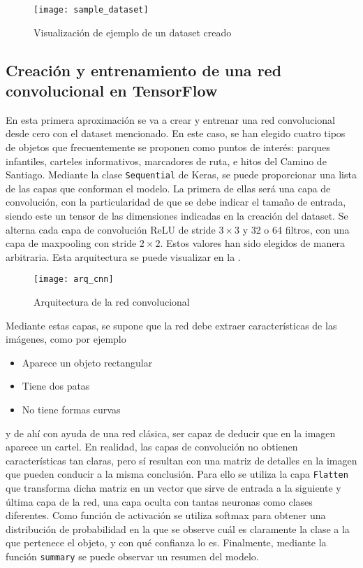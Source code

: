 			\begin{figure}
				\centering
				\texttt{[image: sample\_dataset]}
				\caption{Visualización de ejemplo de un dataset creado}
				\label{fig:sample_dataset}
			\end{figure}
			
		\subsection{Creación y entrenamiento de una red convolucional en TensorFlow}\label{subsec:crear_cnn}
		
			En esta primera aproximación se va a crear y entrenar una red convolucional desde cero con el dataset mencionado. En este caso, se han elegido cuatro tipos de objetos que frecuentemente se proponen como puntos de interés: parques infantiles, carteles informativos, marcadores de ruta, e hitos del Camino de Santiago. Mediante la clase \texttt{Sequential} de Keras, se puede proporcionar una lista de las capas que conforman el modelo. La primera de ellas será una capa de convolución, con la particularidad de que se debe indicar el tamaño de entrada, siendo este un tensor de las dimensiones indicadas en la creación del dataset. Se alterna cada capa de convolución ReLU de stride $3 \times 3$ y 32 o 64 filtros, con una capa de maxpooling con stride $2 \times 2$. Estos valores han sido elegidos de manera arbitraria. Esta arquitectura se puede visualizar en la . \\
			
			\begin{figure}[!h]
				\centering
				\texttt{[image: arq\_cnn]}
				\caption{Arquitectura de la red convolucional}
				\label{fig:arq_cnn}
			\end{figure}
			
			Mediante estas capas, se supone que la red debe extraer características de las imágenes, como por ejemplo
			
			\begin{itemize}
				\item Aparece un objeto rectangular
				\item Tiene dos patas 
				\item No tiene formas curvas
			\end{itemize}
			y de ahí con ayuda de una red clásica, ser capaz de deducir que en la imagen aparece un cartel. En realidad, las capas de convolución no obtienen características tan claras, pero sí resultan con una matriz de detalles en la imagen que pueden conducir a la misma conclusión. Para ello se utiliza la capa \texttt{Flatten} que transforma dicha matriz en un vector que sirve de entrada a la siguiente y última capa de la red, una capa oculta con tantas neuronas como clases diferentes. Como función de activación se utiliza softmax para obtener una distribución de probabilidad en la que se observe cuál es claramente la clase a la que pertenece el objeto, y con qué confianza lo es. Finalmente, mediante la función \texttt{summary} se puede observar un resumen del modelo. 
			
